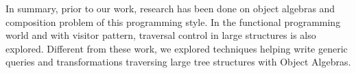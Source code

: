 In summary, prior to our work, research has been done on object
algebras and composition problem of this programming style. In the
functional programming world and with visitor pattern, traversal
control in large structures is also explored. Different from these
work, we explored techniques helping write generic queries and
transformations traversing large tree structures with Object Algebras.

